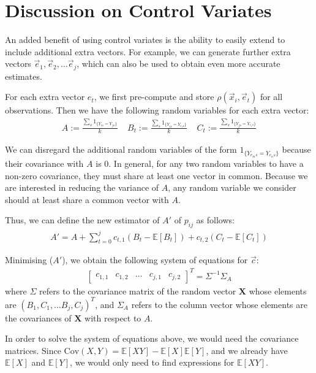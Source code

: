 \documentclass[runningheads]{llncs}
\newcommand{\var}{\text{Var}}
\newcommand{\cov}{\text{Cov}}
\newcommand{\e}{\mathbb{E}}
\begin{document}
\section{Discussion on Control Variates}
    
    An added benefit of using control variates is the ability to easily extend to include additional extra vectors. For example, we can generate further extra vectors $\vec{e}_1, \vec{e}_2, \dots \vec{e}_j$, which can also be used to obtain even more accurate estimates.
    
    For each extra vector $e_t$, we first pre-compute and store $\rho(\vec{x}_i, \vec{e}_t)$ for all observations. Then we have the following random variables for each extra vector:
    \begin{align}
A := \frac{\sum_s 1_{\{Y_{is} = Y_{js}\}}}{k} ~~~~~ B_t := \frac{\sum_s 1_{\{Y_{is} = Y_{e_ts}\}}}{k} ~~~~~ C_t := \frac{\sum_s 1_{\{Y_{js} = Y_{e_ts}\}}}{k}
\end{align}
    
We can disregard the additional random variables of the form $1_{\{Y_{e_ms} = Y_{e_ns}\}}$ because their covariance with $A$ is 0. In general, for any two random variables to have a non-zero covariance, they must share at least one vector in common. Because we are interested in reducing the variance of $A$, any random variable we consider should at least share a common vector with $A$.
 
    Thus, we can define the new estimator of $A'$ of $p_{ij}$ as follows:
    \begin{align}
        A' = A + \sum_{t=0}^j c_{t,1}(B_t - \e[B_t]) + c_{t,2}(C_t - \e[C_t])
    \end{align}

    Minimising \var($A'$), we obtain the following system of equations for $\vec{c}$:
    \begin{align}
        \begin{bmatrix}
                c_{1,1}& c_{1,2} & \dots & c_{j, 1} & c_{j, 2}
        \end{bmatrix}^T = \Sigma^{-1} \Sigma_{A}
    \end{align}
    where $\Sigma$ refers to the covariance matrix of the random vector $\mathbf{X}$ whose elements are $(B_1, C_1, \dots B_j, C_j)^T$, and $\Sigma_{A}$ refers to the column vector whose elements are the covariances of $\mathbf{X}$ with respect to $A$.
    
    In order to solve the system of equations above, we would need the covariance matrices. Since $\cov(X,Y) = \e[XY] - \e[X]\e[Y]$, and we already have $\e[X]$ and $\e[Y]$, we would only need to find expressions for $\e[XY]$.
    
\end{document}
